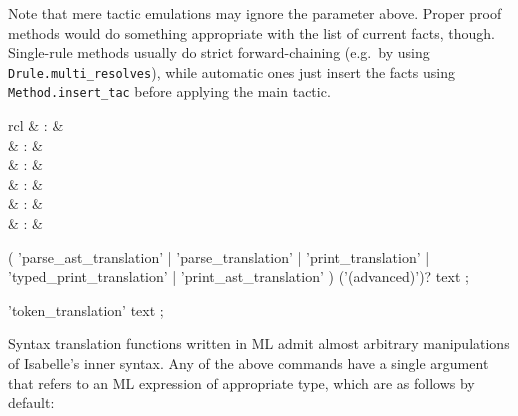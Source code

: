 \begin{isabellebody}
\begin{isamarkuptext}
\begin{descr}
  Note that mere tactic emulations may ignore the 
  parameter above.  Proper proof methods would do something
  appropriate with the list of current facts, though.  Single-rule
  methods usually do strict forward-chaining (e.g.\ by using \verb|Drule.multi_resolves|), while automatic ones just insert the facts
  using \verb|Method.insert_tac| before applying the main tactic.

  \end{descr}%
\end{isamarkuptext}%
\isamarkuptrue%
%
\isamarkuptrue%
%
\begin{isamarkuptext}%
\begin{matharray}{rcl}
    \mbox{} & : &  \\
    \mbox{} & : &  \\
    \mbox{} & : &  \\
    \mbox{} & : &  \\
    \mbox{} & : &  \\
    \mbox{} & : &  \\
  \end{matharray}

  \begin{rail}
  ( 'parse\_ast\_translation' | 'parse\_translation' | 'print\_translation' |
    'typed\_print\_translation' | 'print\_ast\_translation' ) ('(advanced)')? text
  ;

  'token\_translation' text
  ;
  \end{rail}

  Syntax translation functions written in ML admit almost arbitrary
  manipulations of Isabelle's inner syntax.  Any of the above commands
  have a single  argument that refers to an ML
  expression of appropriate type, which are as follows by default:


\end{isamarkuptext}
\end{isabellebody}
